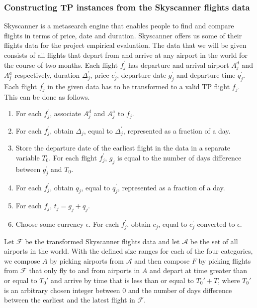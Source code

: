 \documentclass{mprop}
\theoremstyle{definition}
\begin{document}
\subsubsection*{Constructing TP instances from the Skyscanner flights data}

Skyscanner is a metasearch engine that enables people to find and compare flights in terms of price, date and duration. Skyscanner offers us some of their flights data for the project empirical evaluation. The data that we will be given consists of all flights that depart from and arrive at any airport in the world for the course of two months. Each flight $f^{\prime}_{j}$ has departure and arrival airport $A^{d}_{j}$ and $A^{a}_{j}$ respectively, duration $\Delta^{\prime}_{j}$, price $c^{\prime}_{j}$, departure date $g^{\prime}_{j}$ and departure time $q^{\prime}_{j}$. Each flight $f^{\prime}_{j}$ in the given data has to be transformed to a valid TP flight $f_{j}$. This can be done as follows.

\begin{enumerate}
\item For each $f^{\prime}_{j}$, associate $A^{d}_{j}$ and $A^{a}_{j}$ to $f_{j}$.
\item For each $f^{\prime}_{j}$, obtain $\Delta_{j}$, equal to $\Delta^{\prime}_{j}$, represented as a fraction of a day.
\item %
Store the departure date of the earliest flight in the data in a separate variable $T_{0}$. For each flight $f^{\prime}_{j}$, $g_{j}$ is equal to the number of days difference between $g^{\prime}_{j}$ and $T_{0}$.
\item For each $f^{\prime}_{j}$, obtain $q_{j}$, equal to $q^{\prime}_{j}$, represented as a fraction of a day.
\item For each $f_{j}$, $t_{j} = g_{j} + q_{j}$.
\item Choose some currency $\epsilon$. For each $f^{\prime}_{j}$, obtain $c_{j}$, equal to $c^{\prime}_{j}$ converted to $\epsilon$.
\end{enumerate}

Let $\mathcal{F}$ be the transformed Skyscanner flights data and let $\mathcal{A}$ be the set of all airports in the world. With the defined size ranges for each of the four categories, we compose $A$ by picking airports from $\mathcal{A}$ and then compose $F$ by picking flights from $\mathcal{F}$ that only fly to and from airports in $A$ and depart at time greater than or equal to $T_0'$ and arrive by time that is less than or equal to $T_0'+T$, where $T_0'$ is an arbitrary chosen integer between 0 and the number of days difference between the earliest and the latest flight in $\mathcal{F}$.
\end{document}
